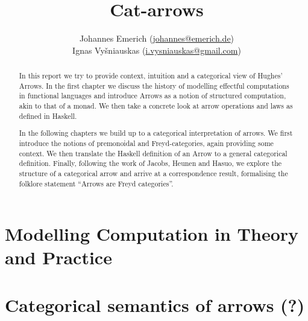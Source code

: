 \documentclass[12pt,a4paper,titlepage]{scrreprt}
\title{Cat-arrows}
\author{%
    Johannes Emerich
        (\href{mailto:Johannes@emerich.de}{johannes@emerich.de})\\
    Ignas Vyšniauskas
        (\href{mailto:i.vysniauskas@gmail.com}{i.vysniauskas@gmail.com})
}
\date{}
\theoremstyle{definition}
\theoremstyle{plain}
\begin{document}
\maketitle

\begin{abstract}
    In this report we try to provide context, intuition and a categorical view
    of Hughes' Arrows. In the first chapter we discuss the history of modelling
    effectful computations in functional languages and introduce Arrows as a
    notion of structured computation, akin to that of a monad. We then take a
    concrete look at arrow operations and laws as defined in Haskell.

    In the following chapters we build up to a categorical interpretation of
    arrows. We first introduce the notions of premonoidal and Freyd-categories,
    again providing some context. We then translate the Haskell definition of an
    Arrow to a general categorical definition. Finally, following the work of
    Jacobs, Heunen and Hasuo, we explore the structure of a categorical arrow
    and arrive at a correspondence result, formalising the folklore statement
    ``Arrows are Freyd categories''.
\end{abstract}


\chapter{Modelling Computation in Theory and Practice}
    
    
\chapter{Categorical semantics of arrows (?)}
    
    
    

\nocite{mustard}
\printbibliography
\end{document}
